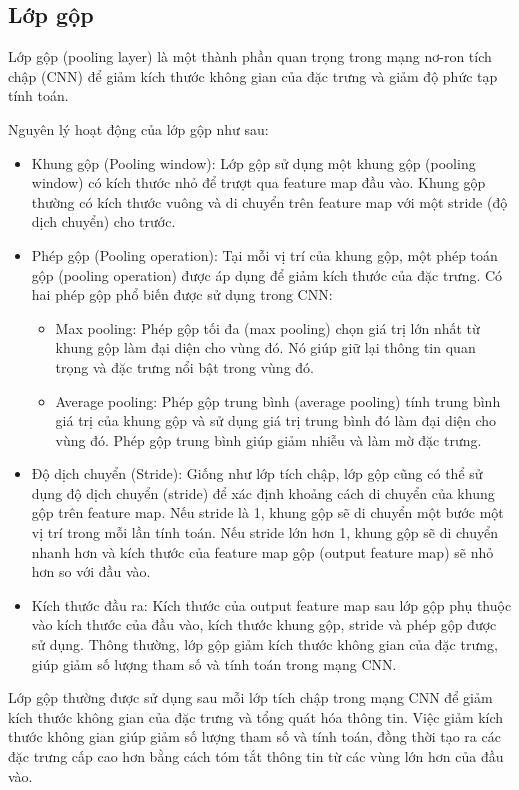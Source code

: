 \subsection{Lớp gộp}
Lớp gộp (pooling layer) là một thành phần quan trọng trong mạng nơ-ron tích chập (CNN) để giảm kích thước không gian của đặc trưng và giảm độ phức tạp tính toán.

Nguyên lý hoạt động của lớp gộp như sau:

\begin{itemize}
    \item Khung gộp (Pooling window): Lớp gộp sử dụng một khung gộp (pooling window) có kích thước nhỏ để trượt qua feature map đầu vào. Khung gộp thường có kích thước vuông và di chuyển trên feature map với một stride (độ dịch chuyển) cho trước.
    \item Phép gộp (Pooling operation): Tại mỗi vị trí của khung gộp, một phép toán gộp (pooling operation) được áp dụng để giảm kích thước của đặc trưng. Có hai phép gộp phổ biến được sử dụng trong CNN:
    \begin{itemize}
        \item Max pooling: Phép gộp tối đa (max pooling) chọn giá trị lớn nhất từ khung gộp làm đại diện cho vùng đó. Nó giúp giữ lại thông tin quan trọng và đặc trưng nổi bật trong vùng đó.
        \item Average pooling: Phép gộp trung bình (average pooling) tính trung bình giá trị của khung gộp và sử dụng giá trị trung bình đó làm đại diện cho vùng đó. Phép gộp trung bình giúp giảm nhiễu và làm mờ đặc trưng.    
    \end{itemize}
    
    \item Độ dịch chuyển (Stride): Giống như lớp tích chập, lớp gộp cũng có thể sử dụng độ dịch chuyển (stride) để xác định khoảng cách di chuyển của khung gộp trên feature map. Nếu stride là 1, khung gộp sẽ di chuyển một bước một vị trí trong mỗi lần tính toán. Nếu stride lớn hơn 1, khung gộp sẽ di chuyển nhanh hơn và kích thước của feature map gộp (output feature map) sẽ nhỏ hơn so với đầu vào.
    \item Kích thước đầu ra: Kích thước của output feature map sau lớp gộp phụ thuộc vào kích thước của đầu vào, kích thước khung gộp, stride và phép gộp được sử dụng. Thông thường, lớp gộp giảm kích thước không gian của đặc trưng, giúp giảm số lượng tham số và tính toán trong mạng CNN.
\end{itemize}

Lớp gộp thường được sử dụng sau mỗi lớp tích chập trong mạng CNN để giảm kích thước không gian của đặc trưng và tổng quát hóa thông tin. Việc giảm kích thước không gian giúp giảm số lượng tham số và tính toán, đồng thời tạo ra các đặc trưng cấp cao hơn bằng cách tóm tắt thông tin từ các vùng lớn hơn của đầu vào.

